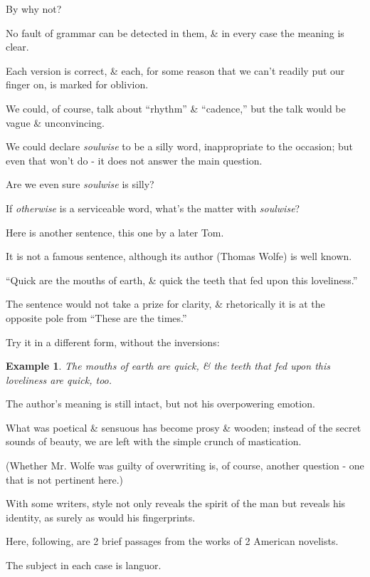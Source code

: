 \documentclass{article}
\newtheorem{example}{Example}
\begin{document}
By why not?

No fault of grammar can be detected in them, \& in every case the meaning is clear.

Each version is correct, \& each, for some reason that we can't readily put our finger on, is marked for oblivion.

We could, of course, talk about ``rhythm'' \& ``cadence,'' but the talk would be vague \& unconvincing.

We could declare {\it soulwise} to be a silly word,    inappropriate to the occasion; but even that won't do - it does not answer the main question.

Are we even sure {\it soulwise} is silly?

If {\it otherwise} is a serviceable word, what's the matter with {\it soulwise}?

%
Here is another sentence, this one by a later Tom.

It is not a famous sentence, although its author (Thomas Wolfe) is well known.

``Quick are the mouths of earth, \& quick the teeth that fed upon this loveliness.''

The sentence would not take a prize for clarity, \& rhetorically it is at the opposite pole from ``These are the times.''

Try it in a different form, without the inversions:
\begin{example}
	The mouths of earth are quick, \& the teeth that fed upon this loveliness are quick, too.
\end{example}
The author's meaning is still intact, but not his overpowering emotion.

What was poetical \& sensuous has become prosy \& wooden; instead of the secret sounds of beauty, we are left with the simple crunch of mastication.

(Whether Mr. Wolfe was guilty of overwriting is, of course, another question - one that is not pertinent here.)

%
With some writers, style not only reveals the spirit of the man but reveals his identity, as surely as would his fingerprints.

Here, following, are 2 brief passages from the works of 2 American novelists.

The subject in each case is languor.
\end{document}
